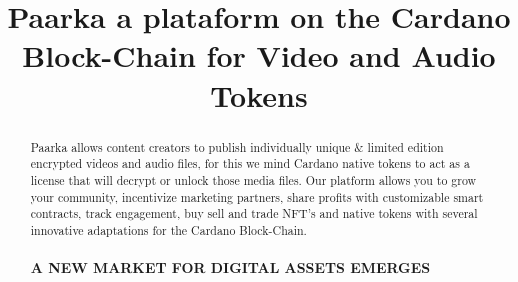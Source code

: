 \documentclass[a4paper,11pt]{article}
\begin{document}
	\title{Paarka a plataform  on the Cardano Block-Chain  for  Video and Audio Tokens }



	


	\maketitle
	



	
	
\begin{abstract}
Paarka allows content creators to publish individually unique $\&$ limited edition encrypted
videos and audio files, for this we mind Cardano native tokens to act as a license that will decrypt
or unlock those media files. 
Our platform allows you to grow  your community, incentivize marketing partners, share profits with customizable smart contracts, track engagement, buy sell and trade NFT’s and native tokens with several innovative adaptations for the Cardano Block-Chain.

\subsubsection*{A NEW MARKET FOR DIGITAL ASSETS EMERGES}


\end{abstract}
\end{document}
